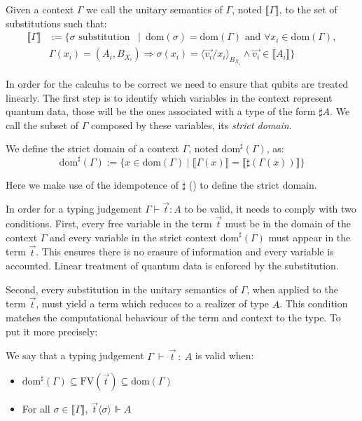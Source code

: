 \documentclass[runningheads,orivec]{llncs}
\newcommand\ansubst[2]{\ensuremath{\langle #1 \rangle_{#2}}}
\newcommand\dom[1]{\mathrm{dom}(#1)}
\newcommand\sdom[1]{\mathrm{dom}^{\sharp}(#1)}
\newcommand\FV[1]{\mathrm{FV}(#1)}
\def\sem#1{\llbracket#1\rrbracket}
\def\TYP#1#2#3{#1~{\vdash}~#2~{:}~#3}
\def\real{\Vdash}
\newcommand\basis[1]{\ensuremath{B_{ #1 }}}
\begin{document}
\begin{definition}
    Given a context $\Gamma$ we call the unitary semantics of $\Gamma$, noted $\sem{\Gamma}$, to the set of substitutions such that:
    \begin{align*}
      \sem{\Gamma} &:= 
      \{\sigma\text{ substitution }~\mid~ \dom{\sigma} = \dom{\Gamma}\text{ and } \forall {x_i} \in\dom{\Gamma},\\
      &\Gamma(x_i) = (A_i, \basis{X_i})\Rightarrow \sigma(x_i)=\ansubst{\vec{v_i}/x_i}{\basis{X_i}} \land \vec{v_i}\in\sem{A_i}\}
    \end{align*}
\end{definition}

In order for the calculus to be correct we need to ensure that qubits are treated linearly. The first step is to identify which variables in the context represent quantum data, those will be the ones associated with a type of the form $\sharp A$. We call the subset of $\Gamma$ composed by these variables, its \emph{strict domain}. 

\begin{definition}
    We define the strict domain of a context $\Gamma$, noted $\sdom{\Gamma}$, as:
    \[
    \sdom{\Gamma} := \{x\in\dom{\Gamma} \mid \sem{\Gamma(x)}=\sem{\sharp(\Gamma(x))}\}
    \]
\end{definition}

Here we make use of the idempotence of $\sharp$ () to define the strict domain. 

In order for a typing judgement $\Gamma\vdash \vec{t}: A$ to be valid, it needs to comply with two conditions. First, every free variable in the term $\vec{t}$ must be in the domain of the context $\Gamma$ and every variable in the strict context $\sdom{\Gamma}$ must appear in the term $\vec{t}$. This ensures there is no erasure of information and every variable is accounted. Linear treatment of quantum data is enforced by the substitution.

Second, every substitution in the unitary semantics of $\Gamma$, when applied to the term $\vec{t}$, must yield a term which reduces to a realizer of type $A$. This condition matches the computational behaviour of the term and context to the type. To put it more precisely: 

\begin{definition}
    We say that a typing judgement $\TYP{\Gamma}{\vec t}{A}$ is valid when:
    \begin{itemize}
        \item $\sdom{\Gamma}\subseteq\FV{\vec t}\subseteq \dom{\Gamma}$
        \item For all $\sigma\in\sem\Gamma$, $\vec{t}\ansubst{\sigma}{}\real A$
    \end{itemize}
\end{definition}
\end{document}
